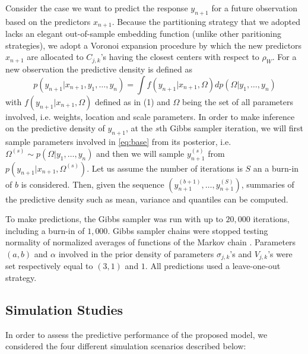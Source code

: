 Consider the case we want to predict the response $y_{n+1}$ for a future observation based on the predictors $x_{n+1}$. Because the partitioning strategy that we adopted lacks an elegant out-of-sample embedding function (unlike other paritioning strategies), we adopt a Voronoi expansion procedure by which  the new predictors $x_{n+1}$ are allocated to $C_{j,k}$'s having the closest centers with respect to $\rho_W$. For a new observation the predictive density is defined as
\begin{equation*}
	p(y_{n+1}|x_{n+1}, y_1, \ldots, y_n) = \int f\left(y_{n+1}|x_{n+1},\Omega\right) dp\left(\Omega|y_1, \ldots, y_n\right) \label{predictive:MSB}
	\end{equation*}
with $f\left(y_{n+1}|x_{n+1},\Omega\right)$ defined as in (1) and $\Omega$ being the set of all parameters involved, i.e. weights, location and scale parameters. In order to make inference on the predictive density of $y_{n+1}$, at the $s$th  Gibbs sampler iteration, we will first sample parameters involved in \ref{eq:base} from its posterior, i.e. $\Omega^{(s)} \sim p\left(\Omega|y_1, \ldots, y_n\right)$ and then we will sample $y^{(s)}_{n+1}$ from $ p\left(y_{n+1}|x_{n+1},\Omega^{(s)}\right)$. Let us assume the number of iterations is $S$ an a burn-in of $b$ is considered. Then, given the sequence $\left(y^{(b+1)}_{n+1}, \ldots, y^{(S)}_{n+1}\right)$, summaries of the predictive density such as mean, variance and quantiles can be computed. 

To make predictions,
the Gibbs sampler was run with up to $20,000$ iterations, including a burn-in of $1,000$. Gibbs sampler chains were stopped testing normality of normalized averages of functions of the Markov chain \cite{Chauveau98anautomated}. Parameters $(a,b)$ and $\alpha$ involved in the prior density of parameters $\sigma_{j,k}$'s and $V_{j,k}$'s were set respectively equal to $(3,1)$ and $1$. All predictions used a leave-one-out strategy. %


\subsection{Simulation Studies}\label{sec:sim}

In order to assess the predictive performance of the proposed model, we considered the four different simulation scenarios described below: 


